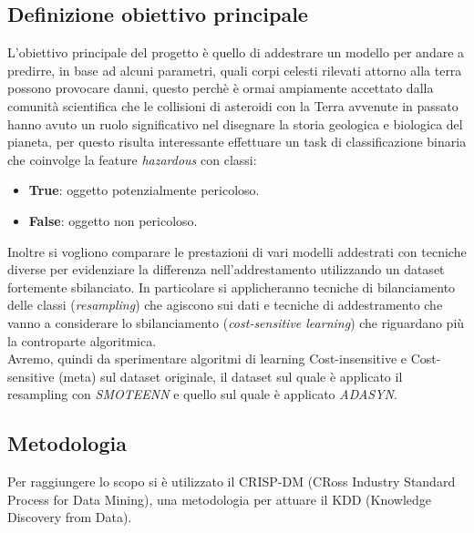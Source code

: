 \documentclass[italian,12pt,a4paper]{article}
\begin{document}
	\subsection{Definizione obiettivo principale}
	L'obiettivo principale del progetto è quello di addestrare un modello per andare a predirre, in base ad alcuni parametri, quali corpi celesti rilevati attorno alla terra possono provocare danni, questo perchè è ormai ampiamente accettato dalla comunità scientifica che le collisioni di asteroidi con la Terra avvenute in passato hanno avuto un ruolo significativo nel disegnare la storia geologica e biologica del pianeta, per questo risulta interessante effettuare un task di classificazione binaria che coinvolge la feature \textit{hazardous} con classi:
	\begin{itemize}
		\item \textbf{True}: oggetto potenzialmente pericoloso.
		\item \textbf{False}: oggetto non pericoloso.
	\end{itemize}
	Inoltre si vogliono comparare le prestazioni di vari modelli addestrati con tecniche diverse per evidenziare la differenza nell'addrestamento utilizzando un dataset fortemente sbilanciato.
	In particolare si applicheranno tecniche di bilanciamento delle classi (\textit{resampling}) che agiscono sui dati e tecniche di addestramento che vanno a considerare lo sbilanciamento (\textit{cost-sensitive learning}) che riguardano più la controparte algoritmica. \\
	Avremo, quindi da sperimentare algoritmi di learning Cost-insensitive e Cost-sensitive (meta) sul dataset originale, il dataset sul quale è applicato il resampling con \textit{SMOTEENN} e quello sul quale è applicato \textit{ADASYN}.
	
	\subsection{Metodologia}
	
	Per raggiungere lo scopo si è utilizzato il CRISP-DM (CRoss Industry Standard Process for Data Mining), una metodologia per attuare il KDD (Knowledge Discovery from Data).
	
\end{document}
